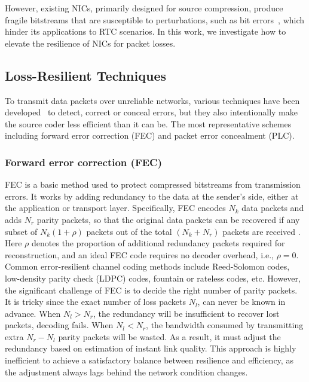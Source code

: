     However, existing NICs, primarily designed for source compression, produce fragile bitstreams that are susceptible to perturbations, such as bit errors~\cite{balle2018integer, tian2023towards}, which hinder its applications to RTC scenarios. 
    In this work, we investigate how to elevate the resilience of NICs for packet losses.

    \subsection{Loss-Resilient Techniques}\label{subsec:loss-resilience-techniques}
    To transmit data packets over unreliable networks, various techniques have been developed~\cite{wang2000error} to detect, correct or conceal errors, but they also intentionally make the source coder less efficient than it can be.
    The most representative schemes including forward error correction (FEC) and packet error concealment (PLC).

    \subsubsection{Forward error correction (FEC)}
    FEC is a basic method used to protect compressed bitstreams from transmission errors.
    It works by adding redundancy to the data at the sender's side, either at the application or transport layer.
    Specifically, FEC encodes $N_{k}$ data packets and adds $N_{r}$ parity packets, so that the original data packets can be recovered if any subset of $N_{k} (1 + \rho)$ packets out of the total $(N_{k} + N_{r})$ packets are received \cite{4427233}.
    Here $\rho$ denotes the proportion of additional redundancy packets required for reconstruction, and an ideal FEC code requires no decoder overhead, i.e., $\rho = 0$.
    Common error-resilient channel coding methods include Reed-Solomon codes, low-density parity check (LDPC) codes, fountain or rateless codes, etc.
    However, the significant challenge of FEC is to decide the right number of parity packets.
    It is tricky since the exact number of loss packets $N_{l}$, can never be known in advance.
    When $N_{l} > N_{r}$, the redundancy will be insufficient to recover lost packets, decoding fails.
    When $N_{l} < N_{r}$, the bandwidth consumed by transmitting extra $N_{r} - N_{l}$ parity packets will be wasted.
    As a result, it must adjust the redundancy based on estimation of instant link quality.
    This approach is highly inefficient to achieve a satisfactory balance between resilience and efficiency, as the adjustment always lags behind the network condition changes.

